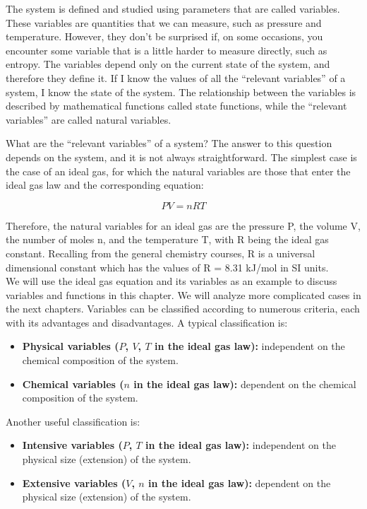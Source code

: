 \documentclass[
]{book}
\providecommand{\tightlist}{%
  \setlength{\itemsep}{0pt}\setlength{\parskip}{0pt}}
\theoremstyle{definition}
\theoremstyle{definition}
\theoremstyle{definition}
\theoremstyle{remark}
\begin{document}
The system is defined and studied using parameters that are called variables. These variables are quantities that we can measure, such as pressure and temperature. However, they don't be surprised if, on some occasions, you encounter some variable that is a little harder to measure directly, such as entropy. The variables depend only on the current state of the system, and therefore they define it. If I know the values of all the ``relevant variables'' of a system, I know the state of the system. The relationship between the variables is described by mathematical functions called state functions, while the ``relevant variables'' are called natural variables.

What are the ``relevant variables'' of a system? The answer to this question depends on the system, and it is not always straightforward. The simplest case is the case of an ideal gas, for which the natural variables are those that enter the ideal gas law and the corresponding equation:

\begin{equation}
  PV=nRT       
  \label{eq:idealgaslaworiginal}
\end{equation}

Therefore, the natural variables for an ideal gas are the pressure P, the volume V, the number of moles n, and the temperature T, with R being the ideal gas constant. Recalling from the general chemistry courses, R is a universal dimensional constant which has the values of R = 8.31 kJ/mol in SI units.\\
We will use the ideal gas equation and its variables as an example to discuss variables and functions in this chapter. We will analyze more complicated cases in the next chapters.
Variables can be classified according to numerous criteria, each with its advantages and disadvantages. A typical classification is:

\begin{itemize}
\tightlist
\item
  \textbf{Physical variables (\(P\), \(V\), \(T\) in the ideal gas law):} independent on the chemical composition of the system.
\item
  \textbf{Chemical variables (\(n\) in the ideal gas law):} dependent on the chemical composition of the system.
\end{itemize}

Another useful classification is:

\begin{itemize}
\tightlist
\item
  \textbf{Intensive variables (\(P\), \(T\) in the ideal gas law):} independent on the physical size (extension) of the system.
\item
  \textbf{Extensive variables (\(V\), \(n\) in the ideal gas law):} dependent on the physical size (extension) of the system.
\end{itemize}
\end{document}
